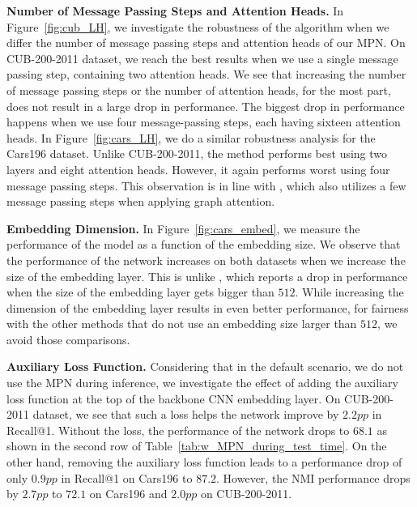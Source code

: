 \documentclass{article}
\begin{document}
\noindent\textbf{Number of Message Passing Steps and Attention Heads.} In Figure~\ref{fig:cub_LH}, we investigate the robustness of the algorithm when we differ the number of message passing steps and attention heads of our MPN. On CUB-200-2011 dataset, we reach the best results when we use a single message passing step, containing two attention heads. We see that increasing the number of message passing steps or the number of attention heads, for the most part, does not result in a large drop in performance. The biggest drop in performance happens when we use four message-passing steps, each having sixteen attention heads. 
In Figure~\ref{fig:cars_LH}, we do a similar robustness analysis for the Cars196 dataset. Unlike CUB-200-2011, the method performs best using two layers and eight attention heads. However, it again performs worst using four message passing steps.
This observation is in line with \cite{DBLP:conf/iclr/VelickovicCCRLB18}, which also utilizes a few message passing steps when applying graph attention. 



\noindent\textbf{Embedding Dimension.} In Figure~\ref{fig:cars_embed}, we measure the performance of the model as a function of the embedding size. We observe that the performance of the network increases on both datasets when we increase the size of the embedding layer. This is unlike \cite{DDBLP:conf/cvpr/Wand2019}, which reports a drop in performance when the size of the embedding layer gets bigger than $512$. While increasing the dimension of the embedding layer results in even better performance, for fairness with the other methods that do not use an embedding size larger than $512$, we avoid those comparisons. 

\noindent\textbf{Auxiliary Loss Function.} Considering that in the default scenario, we do not use the MPN during inference, we investigate the effect of adding the auxiliary loss function at the top of the backbone CNN embedding layer. On CUB-200-2011 dataset, we see that such a loss helps the network improve by $2.2pp$ in Recall@1. Without the loss, the performance of the network drops to $68.1$ as shown in the second row of Table~\ref{tab:w_MPN_during_test_time}. On the other hand, removing the auxiliary loss function leads to a performance drop of only $0.9pp$ in Recall@1 on Cars196 to $87.2$. However, the NMI performance drops by $2.7pp$ to $72.1$ on Cars196 and $2.0pp$ on CUB-200-2011. 
\end{document}
